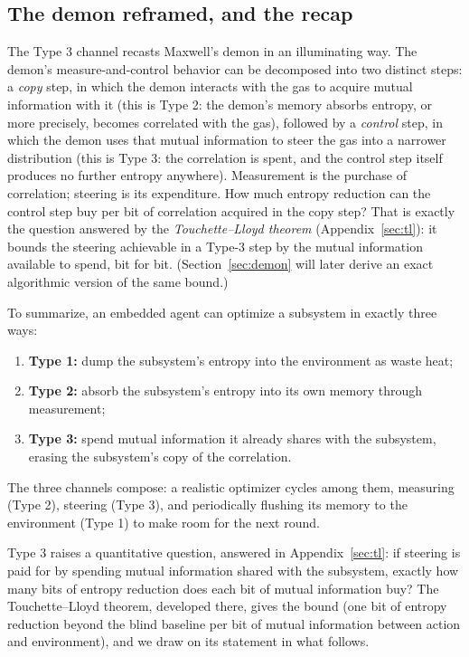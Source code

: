 \documentclass[10pt]{article}
\theoremstyle{definition}
\theoremstyle{remark}
\begin{document}
\subsection{The demon reframed, and the recap}
\label{sec:demonreframe}

The Type 3 channel recasts Maxwell's demon in an illuminating way. The demon's measure-and-control behavior can be decomposed into two distinct steps: a \emph{copy} step, in which the demon interacts with the gas to acquire mutual information with it (this is Type 2: the demon's memory absorbs entropy, or more precisely, becomes correlated with the gas), followed by a \emph{control} step, in which the demon uses that mutual information to steer the gas into a narrower distribution (this is Type 3: the correlation is spent, and the control step itself produces no further entropy anywhere). Measurement is the purchase of correlation; steering is its expenditure. How much entropy reduction can the control step buy per bit of correlation acquired in the copy step? That is exactly the question answered by the \emph{Touchette--Lloyd theorem} (Appendix~\ref{sec:tl}): it bounds the steering achievable in a Type-3 step by the mutual information available to spend, bit for bit. (Section~\ref{sec:demon} will later derive an exact algorithmic version of the same bound.)

To summarize, an embedded agent can optimize a subsystem in exactly three ways:
\begin{enumerate}[leftmargin=2em]
  \item \textbf{Type 1:} dump the subsystem's entropy into the environment as waste heat;
  \item \textbf{Type 2:} absorb the subsystem's entropy into its own memory through measurement;
  \item \textbf{Type 3:} spend mutual information it already shares with the subsystem, erasing the subsystem's copy of the correlation.
\end{enumerate}
The three channels compose: a realistic optimizer cycles among them, measuring (Type 2), steering (Type 3), and periodically flushing its memory to the environment (Type 1) to make room for the next round.

Type 3 raises a quantitative question, answered in Appendix~\ref{sec:tl}: if steering is paid for by spending mutual information shared with the subsystem, exactly how many bits of entropy reduction does each bit of mutual information buy? The Touchette--Lloyd theorem, developed there, gives the bound (one bit of entropy reduction beyond the blind baseline per bit of mutual information between action and environment), and we draw on its statement in what follows.
\end{document}
